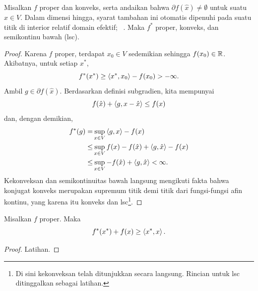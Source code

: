 \begin{lemma}
    Misalkan $f$ proper dan konveks, serta andaikan bahwa $\partial f(\hat x) \neq \emptyset$ untuk suatu $\hat x\in V$. Dalam dimensi hingga, syarat tambahan ini otomatis dipenuhi pada suatu titik di interior relatif domain efektif; \cf~\cite[Corollary 3.19]{beck2017first}. Maka $f^*$ proper, konveks, dan semikontinu bawah (lsc).
\end{lemma}
\begin{proof}
    Karena $f$ proper, terdapat $x_0\in V$ sedemikian sehingga $f(x_0)\in \mathbb{R}$. Akibatnya, untuk setiap $x^*$,
    \begin{equation}
        f^*(x^*)\geq \left\langle x^* , x_0\right\rangle - f(x_0)> -\infty.
    \end{equation}
    Ambil $g\in \partial f(\hat x)$. Berdasarkan definisi subgradien, kita mempunyai
    \begin{equation}
        f(\hat x) + \left\langle g , x-\hat x\right\rangle\leq f(x)
    \end{equation}
    dan, dengan demikian,
    \begin{equation}
        \begin{aligned}
            f^*(g)
            =& \sup_{x\in V}\left\langle g , x\right\rangle - f(x)\\
            \leq& \sup_{x\in V}f(x) - f(\hat x) + \left\langle g , \hat x\right\rangle - f(x)\\
            \leq& \sup_{x\in V}- f(\hat x) + \left\langle g , \hat x\right\rangle <\infty.
        \end{aligned}
    \end{equation}
    Kekonveksan dan semikontinuitas bawah langsung mengikuti fakta bahwa konjugat konveks merupakan supremum titik demi titik dari fungsi-fungsi afin kontinu, yang karena itu konveks dan lsc\footnote{Di sini kekonveksan telah ditunjukkan secara langsung. Rincian untuk lsc ditinggalkan sebagai latihan.}.
\end{proof}

\begin{lemma}
    Misalkan $f$ proper. Maka
    \begin{equation}
        f^*(x^*) + f(x)\geq \left\langle x^* , x\right\rangle.
    \end{equation}
\end{lemma}
\begin{proof}
    Latihan.
\end{proof}

